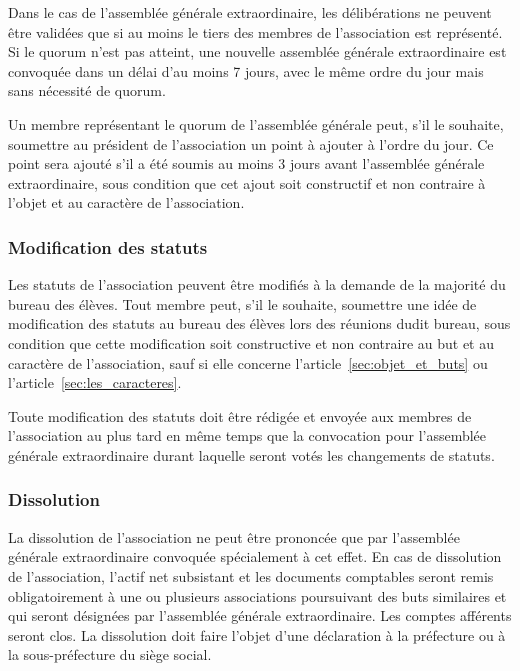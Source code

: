\documentclass{article}
\begin{document}
				Dans le cas de l’assemblée générale extraordinaire, les
				délibérations ne peuvent être validées que si au moins le tiers
				des membres de l’association est représenté. Si le quorum n’est
				pas atteint, une nouvelle assemblée générale extraordinaire est
				convoquée dans un délai d’au moins 7 jours, avec le même ordre
				du jour mais sans nécessité de quorum.

				Un membre représentant le quorum de l’assemblée générale peut,
				s’il le souhaite, soumettre au président de l’association un
				point à ajouter à l’ordre du jour. Ce point sera ajouté s’il a
				été soumis au moins 3 jours avant l’assemblée générale
				extraordinaire, sous condition que cet ajout soit constructif et
				non contraire à l'objet et au caractère de l’association.

			\subsubsection{Modification des statuts}
\label{ssub:modification_des_statuts}
			
				Les statuts de l’association peuvent être modifiés à la demande
				de la majorité du bureau des élèves. Tout membre peut, s’il le
				souhaite, soumettre une idée de modification des statuts au
				bureau des élèves lors des réunions dudit bureau, sous condition
				que cette modification soit constructive et non contraire au but
				et au caractère de l’association, sauf si elle concerne
				l'article~\ref{sec:objet_et_buts} ou
				l'article~\ref{sec:les_caracteres}.

				Toute modification des statuts doit être rédigée et envoyée aux
				membres de l’association au plus tard en même temps que la
				convocation pour l’assemblée générale extraordinaire durant
				laquelle seront votés les changements de statuts.

			\subsubsection{Dissolution}
\label{ssub:dissolution}
			
				La dissolution de l’association ne peut être prononcée que par
				l’assemblée générale extraordinaire convoquée spécialement à cet
				effet. En cas de dissolution de l’association, l’actif net
				subsistant et les documents comptables seront remis
				obligatoirement à une ou plusieurs associations poursuivant des
				buts similaires et qui seront désignées par l’assemblée générale
				extraordinaire. Les comptes afférents seront clos. La
				dissolution doit faire l’objet d’une déclaration à la préfecture
				ou à la sous-préfecture du siège social.
\end{document}
